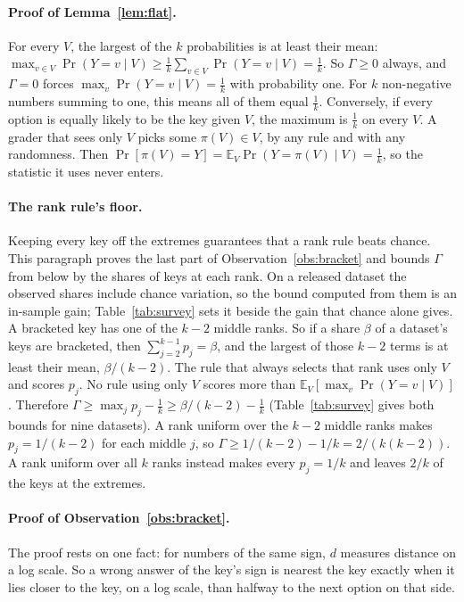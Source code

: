 \documentclass{article}
\begin{document}
\paragraph{Proof of Lemma~\ref{lem:flat}.} For every $V$, the largest of the $k$ probabilities is at least their
mean: $\max_{v\in V}\Pr(Y=v\mid V)\ge\frac1k\sum_{v\in V}\Pr(Y=v\mid V)=\frac1k$. So $\Gamma\ge0$ always, and
$\Gamma=0$ forces $\max_{v}\Pr(Y=v\mid V)=\frac1k$ with probability one. For $k$ non-negative numbers summing to one,
this means all of them equal $\frac1k$. Conversely, if every option is equally likely to be the key given $V$, the
maximum is $\frac1k$ on every $V$. A grader that sees only $V$ picks some $\pi(V)\in V$, by any rule and with any
randomness. Then $\Pr[\pi(V)=Y]=\mathbb{E}_V\Pr(Y=\pi(V)\mid V)=\frac1k$, so the statistic it uses never enters.

\paragraph{The rank rule's floor.} Keeping every key off the extremes guarantees that a rank rule beats chance. This
paragraph proves the last part of Observation~\ref{obs:bracket} and bounds $\Gamma$ from below by the shares of keys
at each rank. On a released dataset the observed shares include chance variation, so the bound computed from them is
an in-sample gain; Table~\ref{tab:survey} sets it beside the gain that chance alone gives. A bracketed key has one of the $k-2$ middle ranks. So if a share $\beta$ of a dataset's keys are bracketed,
then $\sum_{j=2}^{k-1}p_j=\beta$, and the largest of those $k-2$ terms is at least their mean, $\beta/(k-2)$. The rule
that always selects that rank uses only $V$ and scores $p_j$. No rule using only $V$ scores more than
$\mathbb{E}_V[\max_v\Pr(Y=v\mid V)]$. Therefore $\Gamma\ge\max_jp_j-\tfrac1k\ge\beta/(k-2)-\tfrac1k$
(Table~\ref{tab:survey} gives both bounds for nine datasets). A rank uniform over the $k-2$ middle ranks makes
$p_j=1/(k-2)$ for each middle $j$, so $\Gamma\ge1/(k-2)-1/k=2/(k(k-2))$. A rank uniform over all $k$ ranks instead
makes every $p_j=1/k$ and leaves $2/k$ of the keys at the extremes.

\paragraph{Proof of Observation~\ref{obs:bracket}.} The proof rests on one fact: for numbers of the same sign, $d$
measures distance on a log scale. So a wrong answer of the key's sign is nearest the key exactly when it lies closer to
the key, on a log scale, than halfway to the next option on that side.
\end{document}

